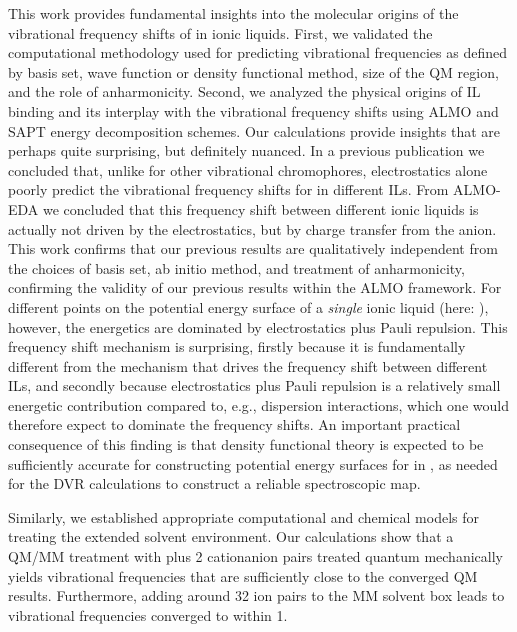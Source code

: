 \documentclass[%
  class = book,%
  crop = false,%
  float = true,%
  multi = true,%
  preview = false,%
]{standalone}
\newcommand{\cotil}{\ce{CO2}\textendash{}IL\xspace}%
\begin{document}
This work provides fundamental insights into the molecular origins of the vibrational frequency shifts of  in ionic liquids. First, we validated the computational methodology used for predicting vibrational frequencies \textemdash{} as defined by basis set, wave function or density functional method, size of the QM region, and the role of anharmonicity. Second, we analyzed the physical origins of \cotil binding and its interplay with the vibrational frequency shifts using ALMO and SAPT energy decomposition schemes. Our calculations provide insights that are perhaps quite surprising, but definitely nuanced. In a previous publication we concluded that, unlike for other vibrational chromophores, electrostatics alone poorly predict the vibrational frequency shifts for  in different ILs. From ALMO-EDA we concluded that this frequency shift between different ionic liquids is actually not driven by the electrostatics, but by charge transfer from the anion. This work confirms that our previous results are qualitatively independent from the choices of basis set, ab initio method, and treatment of anharmonicity, confirming the validity of our previous results within the ALMO framework. For different points on the potential energy surface of a \emph{single} ionic liquid (here: \ce{[C4C1im][PF6]}), however, the energetics are dominated by electrostatics plus Pauli repulsion. This frequency shift mechanism is surprising, firstly because it is fundamentally different from the mechanism that drives the  frequency shift between different ILs, and secondly because electrostatics plus Pauli repulsion is a relatively small energetic contribution compared to, e.g., dispersion interactions, which one would therefore expect to dominate the frequency shifts. An important practical consequence of this finding is that density functional theory is expected to be sufficiently accurate for constructing potential energy surfaces for  in \ce{[C4C1im][PF6]}, as needed for the DVR calculations to construct a reliable spectroscopic map.

Similarly, we established appropriate computational and chemical models for treating the extended solvent environment. Our calculations show that a QM/MM treatment with  plus \num{2} cation\textendash{}anion pairs treated quantum mechanically yields vibrational frequencies that are sufficiently close to the converged QM results. Furthermore, adding around \num{32} ion pairs to the MM solvent box leads to vibrational frequencies converged to within \SI{1}{\wavenumber}.
\end{document}
